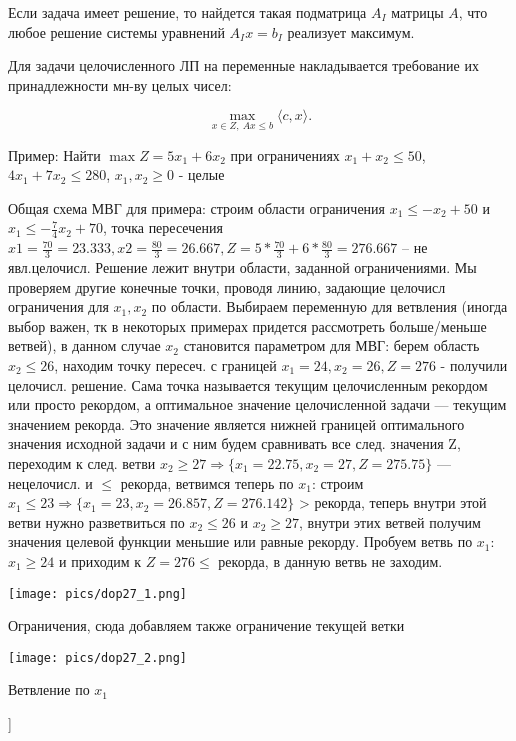 Если задача имеет решение, то найдется такая подматрица $A_I$ матрицы $A$, что любое решение системы уравнений $A_Ix = b_I$ реализует максимум.

Для задачи целочисленного ЛП на переменные накладывается требование их принадлежности мн-ву целых чисел:

$$\max_{x \in Z,~Ax \leqslant b} \langle c, x \rangle.$$

Пример: Найти $\max Z = 5x_1 + 6x_2$ при ограничениях $x_1+x_2 \leq 50$, $4x_1+7x_2 \leq 280$, $x_1,x_2 \geq 0$ - целые

Общая схема МВГ для примера: строим области ограничения $x_1 \leq -x_2+50$ и $x_1 \leq - \frac{7}{4}x_2+70$,
точка пересечения $x1=\frac{70}{3}=23.333, x2=\frac{80}{3}=26.667, Z=5*\frac{70}{3}+6*\frac{80}{3}=276.667$ -- не явл.целочисл.
Решение лежит внутри области, заданной ограничениями.
Мы проверяем другие конечные точки, проводя линию, задающие целочисл ограничения для $x_1, x_2$ по области.
Выбираем переменную для ветвления (иногда выбор важен, тк в некоторых примерах придется рассмотреть больше/меньше ветвей),
в данном случае $x_2$ становится параметром для МВГ: берем область $x_2 \leq 26$, находим точку пересеч.
с границей ${x_1=24, x_2=26, Z=276}$ - получили целочисл. решение.
Сама точка называется текущим целочисленным рекордом или просто рекордом, а оптимальное значение целочисленной задачи — текущим значением рекорда.
Это значение является нижней границей оптимального значения исходной задачи и с ним будем сравнивать все след. значения Z,
переходим к след. ветви $x_2 \geq 27 \Rightarrow \{x_1=22.75, x_2=27, Z=275.75\}$ --- нецелочисл. и $\leq$ рекорда, ветвимся теперь по $x_1$:
строим $x_1 \leq 23 \Rightarrow \{x_1=23, x_2=26.857, Z=276.142 \}$ > рекорда, теперь внутри этой ветви нужно разветвиться по $x_2 \leq 26$ и $x_2 \geq 27$,
внутри этих ветвей получим значения целевой функции меньшие или равные рекорду.
Пробуем ветвь по $x_1:$ $x_1 \geq 24$ и приходим к $Z=276 \leq$ рекорда, в данную ветвь не заходим.


\texttt{[image: pics/dop27\_1.png]}

Ограничения, сюда добавляем также ограничение текущей ветки


\texttt{[image: pics/dop27\_2.png]}

Ветвление по $x_1$

\bigbreak
[\cite[page 69-96]{replace_me}]
